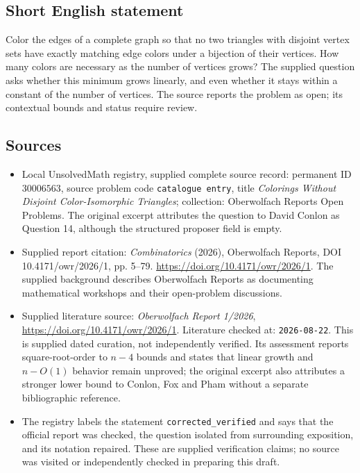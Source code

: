 \documentclass[11pt]{article}
\begin{document}
\subsection{Short English statement}
Color the edges of a complete graph so that no two triangles with disjoint vertex sets have exactly matching edge colors under a bijection of their vertices. How many colors are necessary as the number of vertices grows? The supplied question asks whether this minimum grows linearly, and even whether it stays within a constant of the number of vertices. The source reports the problem as open; its contextual bounds and status require review.
\subsection{Sources}
\begin{itemize}
\item Local UnsolvedMath registry, supplied complete source record: permanent ID \(30006563\), source problem code \texttt{catalogue entry}, title \emph{Colorings Without Disjoint Color-Isomorphic Triangles}; collection: Oberwolfach Reports Open Problems. The original excerpt attributes the question to David Conlon as Question 14, although the structured proposer field is empty.
\item Supplied report citation: \emph{Combinatorics} (2026), Oberwolfach Reports, DOI 10.4171/owr/2026/1, pp. 5--79. \url{https://doi.org/10.4171/owr/2026/1}. The supplied background describes Oberwolfach Reports as documenting mathematical workshops and their open-problem discussions.
\item Supplied literature source: \emph{Oberwolfach Report 1/2026}, \url{https://doi.org/10.4171/owr/2026/1}. Literature checked at: \texttt{2026-08-22}. This is supplied dated curation, not independently verified. Its assessment reports square-root-order to \(n-4\) bounds and states that linear growth and \(n-O(1)\) behavior remain unproved; the original excerpt also attributes a stronger lower bound to Conlon, Fox and Pham without a separate bibliographic reference.
\item The registry labels the statement \texttt{corrected\_verified} and says that the official report was checked, the question isolated from surrounding exposition, and its notation repaired. These are supplied verification claims; no source was visited or independently checked in preparing this draft.
\end{itemize}
\end{document}
